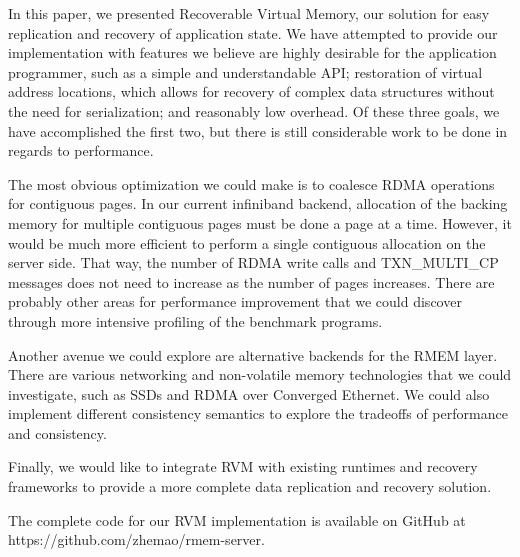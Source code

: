 In this paper, we presented Recoverable Virtual Memory, our solution for easy
replication and recovery of application state. We have attempted to provide
our implementation with features we believe are highly desirable for the
application programmer, such as a simple and understandable API; restoration
of virtual address locations, which allows for recovery of complex data
structures without the need for serialization; and reasonably low overhead.
Of these three goals, we have accomplished the first two, but there is still
considerable work to be done in regards to performance.

The most obvious optimization we could make is to coalesce RDMA operations for
contiguous pages. In our current infiniband backend, allocation of the backing
memory for multiple contiguous pages must be done a page at a time.
However, it would be much more efficient to perform a single contiguous
allocation on the server side. That way, the number of RDMA write calls and
TXN\_MULTI\_CP messages does not need to increase as the number of pages
increases. There are probably other areas for performance improvement that we
could discover through more intensive profiling of the benchmark programs.

Another avenue we could explore are alternative backends for the RMEM layer.
There are various networking and non-volatile memory technologies that we
could investigate, such as SSDs and RDMA over Converged Ethernet. We could also
implement different consistency semantics to explore the tradeoffs of performance
and consistency.

Finally, we would like to integrate RVM with existing runtimes and recovery
frameworks to provide a more complete data replication and recovery solution.

The complete code for our RVM implementation is available on GitHub at
https://github.com/zhemao/rmem-server.
